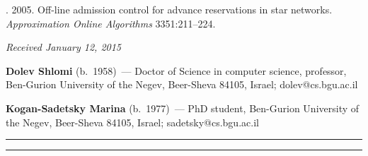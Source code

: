 \begin{multicols}{2}
{{\begin{thebibliography}{99}




. 2005.
Off-line admission control for advance
reservations in star networks.
\textit{Approximation Online
Algorithms} 3351:211--224.

\end{thebibliography} } }

\end{multicols}

\vspace*{-3pt}

\hfill{\small\textit{Received January 12, 2015}}

\vspace*{-24pt}

\Contr

\noindent
\textbf{Dolev Shlomi} (b.\ 1958)~---
Doctor of Science in computer science, professor, Ben-Gurion University of the Negev,
Beer-Sheva 84105, Israel; dolev@cs.bgu.ac.il

\vspace*{3pt}

\noindent
\textbf{Kogan-Sadetsky Marina} (b.\ 1977)~--- PhD student,
Ben-Gurion University of the Negev,
Beer-Sheva 84105, Israel; sadetsky@cs.bgu.ac.il

\vspace*{10pt}

\hrule

\vspace*{2pt}

\hrule

\vspace*{10pt}



\def\tit{ЭВРИСТИЧЕСКИЕ СЕРТИФИКАТЫ ПОСРЕДСТВОМ ПРИБЛИЖЕНИЙ}

\def\aut{Ш.~Долев$^1$, М.~Коган-Садецкая$^2$}


\def\titkol{Эвристические сертификаты посредством приближений}

